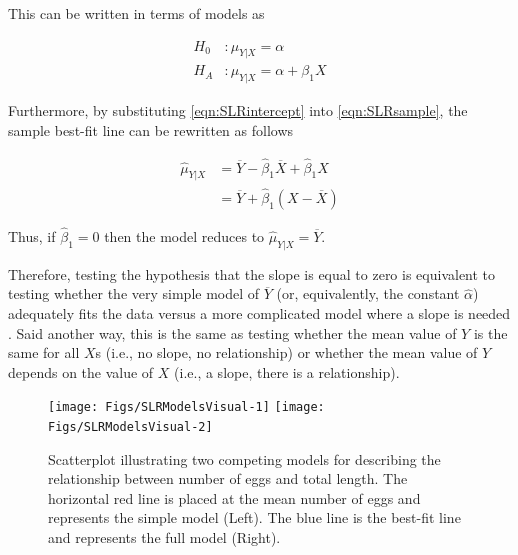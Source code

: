 \documentclass[10pt,openany]{book}\usepackage[]{graphicx}\usepackage[]{color}
\newenvironment{knitrout}{}{} %
\begin{document}
This can be written in terms of models as

\[ \begin{split}
H_{0}&: \mu_{Y|X} = \alpha \\
H_{A}&: \mu_{Y|X} = \alpha + \beta_{1}X
\end{split} \]

Furthermore, by substituting \eqref{eqn:SLRintercept} into \eqref{eqn:SLRsample}, the sample best-fit line can be rewritten as follows

\[ \begin{split} \hat{\mu}_{Y|X} &= \overline{Y} - \hat{\beta}_{1}\overline{X} + \hat{\beta}_{1}X \\
                                 &= \overline{Y} + \hat{\beta}_{1}\left(X-\overline{X}\right) \end{split} \]

Thus, if $\hat{\beta}_{1}=0$ then the model reduces to $\hat{\mu}_{Y|X}=\overline{Y}$.

Therefore, testing the hypothesis that the slope is equal to zero is equivalent to testing whether the very simple model of $\overline{Y}$ (or, equivalently, the constant $\hat{\alpha}$) adequately fits the data versus a more complicated model where a slope is needed .  Said another way, this is the same as testing whether the mean value of $Y$ is the same for all $X$s (i.e., no slope, no relationship) or whether the mean value of $Y$ depends on the value of $X$ (i.e., a slope, there is a relationship).

\begin{knitrout}
\color{fgcolor}\begin{figure}[h]

{\centering \texttt{[image: Figs/SLRModelsVisual-1]} 
\texttt{[image: Figs/SLRModelsVisual-2]} 

}

\caption[Scatterplot illustrating two competing models for describing the relationship between number of eggs and total length]{Scatterplot illustrating two competing models for describing the relationship between number of eggs and total length.  The horizontal red line is placed at the mean number of eggs and represents the simple model (Left).  The blue line is the best-fit line and represents the full model (Right).}\label{fig:SLRModelsVisual}
\end{figure}


\end{knitrout}
\end{document}
